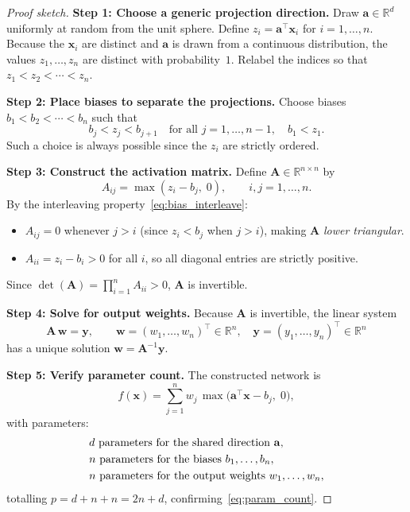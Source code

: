 \documentclass[12pt,a4paper]{article}
\theoremstyle{definition}
\theoremstyle{remark}
\begin{document}
\begin{proof}[Proof sketch]
\textbf{Step 1: Choose a generic projection direction.}
Draw $\mathbf{a} \in \mathbb{R}^d$ uniformly at random from the unit sphere.
Define $z_i = \mathbf{a}^\top \mathbf{x}_i$ for $i = 1,\ldots,n$.
Because the $\mathbf{x}_i$ are distinct and $\mathbf{a}$ is drawn from a continuous
distribution, the values $z_1,\ldots,z_n$ are distinct with probability~$1$.
Relabel the indices so that $z_1 < z_2 < \cdots < z_n$.

\textbf{Step 2: Place biases to separate the projections.}
Choose biases $b_1 < b_2 < \cdots < b_n$ such that
\begin{equation}
  b_j < z_j < b_{j+1} \quad \text{for all } j = 1,\ldots,n-1,
  \quad b_1 < z_1.
  \label{eq:bias_interleave}
\end{equation}
Such a choice is always possible since the $z_i$ are strictly ordered.

\textbf{Step 3: Construct the activation matrix.}
Define $\mathbf{A} \in \mathbb{R}^{n \times n}$ by
\begin{equation}
  A_{ij} = \max(z_i - b_j,\; 0), \qquad i,j = 1,\ldots,n.
  \label{eq:activation_matrix}
\end{equation}
By the interleaving property~\eqref{eq:bias_interleave}:
\begin{itemize}
  \item $A_{ij} = 0$ whenever $j > i$ (since $z_i < b_j$ when $j > i$),
        making $\mathbf{A}$ \emph{lower triangular}.
  \item $A_{ii} = z_i - b_i > 0$ for all $i$, so all diagonal entries are strictly
        positive.
\end{itemize}
Since $\det(\mathbf{A}) = \prod_{i=1}^n A_{ii} > 0$, $\mathbf{A}$ is invertible.

\textbf{Step 4: Solve for output weights.}
Because $\mathbf{A}$ is invertible, the linear system
\begin{equation}
  \mathbf{A}\,\mathbf{w} = \mathbf{y}, \qquad
  \mathbf{w} = (w_1,\ldots,w_n)^\top \in \mathbb{R}^n,\quad
  \mathbf{y} = (y_1,\ldots,y_n)^\top \in \mathbb{R}^n
  \label{eq:linear_system}
\end{equation}
has a unique solution $\mathbf{w} = \mathbf{A}^{-1}\mathbf{y}$.

\textbf{Step 5: Verify parameter count.}
The constructed network is
\begin{equation}
  f(\mathbf{x}) = \sum_{j=1}^{n} w_j\, \max\!\bigl(\mathbf{a}^\top \mathbf{x} - b_j,\; 0\bigr),
  \label{eq:network}
\end{equation}
with parameters:
\begin{align}
  &d \text{ parameters for the shared direction } \mathbf{a}, \notag\\
  &n \text{ parameters for the biases } b_1,\ldots,b_n, \notag\\
  &n \text{ parameters for the output weights } w_1,\ldots,w_n, \notag
\end{align}
totalling $p = d + n + n = 2n + d$, confirming~\eqref{eq:param_count}.


\end{proof}
\end{document}
